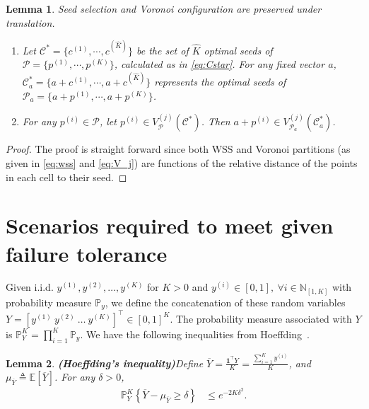 \documentclass[11pt,letterpaper]{article}
\newtheorem{lemma}{Lemma}
\newcommand{\mcP}{\mathcal{P}}
\newcommand{\mcC}{\mathcal{C}}
\newcommand{\Prob}{\mathbb{P}}
\newcommand{\Exp}{\mathbb{E}}
\begin{document}
	\begin{lemma} \label{lem:translation}
		Seed selection and Voronoi configuration are preserved under  translation. 
		\begin{enumerate}
			\item Let $\mcC^\ast=\{c^{(1)},\cdots,c^{(\hat{K})}\}$ be the set of $\hat{K}$ optimal seeds of $\mcP=\{p^{(1)},\cdots,p^{(K)}\}$, calculated as in \eqref{eq:Cstar}. For any fixed vector $a$, $\mcC^{\ast}_{a}=\{a+c^{(1)},\cdots,a+c^{(\hat{K})}\}$ represents the optimal seeds of $\mcP_{a}=\{a+p^{(1)},\cdots,a+p^{(K)}\}$.
			\item For any $p^{(i)}\in\mcP$, let $p^{(i)}\in V^{(j)}_{\mcP}(\mcC^{\ast})$. Then $a+p^{(i)}\in V^{(j)}_{\mcP_a}(\mcC_a^{\ast})$.
		\end{enumerate}
	\end{lemma}
	\begin{proof}
		The proof is straight forward since both $\mathrm{WSS}$ and Voronoi partitions (as given in \eqref{eq:wss} and \eqref{eq:V_j}) are functions of the relative distance of the points in each cell to their seed. 
	\end{proof}
	
	
	\section{Scenarios required to meet given failure tolerance}
	\label{sec:BoundOnSamples}
	Given i.i.d. $y^{(1)}, y^{(2)},\ldots,y^{(K)}$ for $K>0$ and $y^{(i)}\in[0,1],\ \forall i\in \mathbb{N}_{[1,K]}$ with probability measure $\Prob_y$, we define the concatenation of these random variables $Y=[y^{(1)}\ y^{(2)}\ \ldots\ y^{(K)}]^\top\in {[0,1]}^K$.
	The probability measure associated with $Y$ is $\Prob_Y^K=\prod_{i=1}^K \Prob_y$.
	We have the following inequalities from Hoeffding~\cite[Thm.
    1]{hoeffding_probability_1963}.


\begin{lemma}{\textbf{(Hoeffding's inequality)}}\label{lem:Hoeffding}
		Define $ \overline{Y}=\frac{\mathbf{1}^\top Y}{K}=\frac{\sum_{i=1}^K y^{(i)}}{K}$, and $\mu_{\overline{Y}}\triangleq\Exp\left[ \overline{Y}  \right]$.
		For any $\delta>0$,
		\begin{align}   \label{eq:Hoeff_OneSide} 
		\Prob_{Y}^K\left\{ \overline{Y} - \mu_{\overline{Y}} \geq \delta \right\}&\leq e^{-2K\delta^2}.    %
		\end{align}
	\end{lemma}
	
\end{document}
